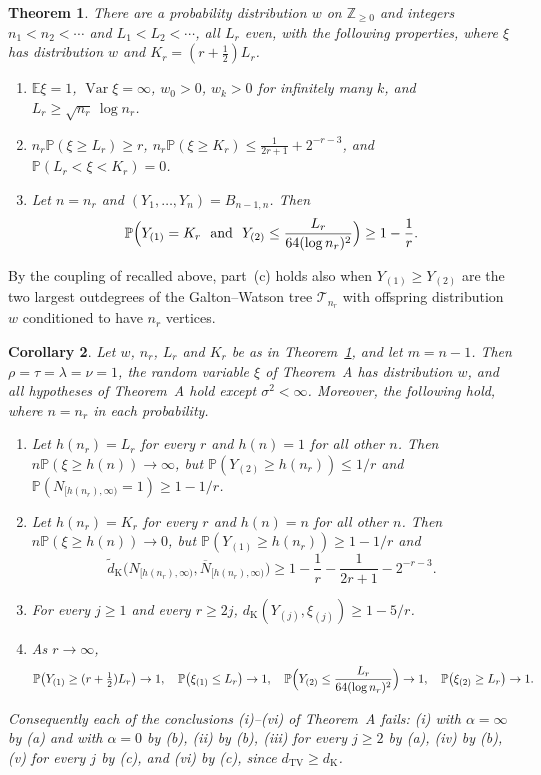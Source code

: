 \documentclass[11pt]{amsart}
\newtheorem{theorem}{Theorem}
\newtheorem{corollary}[theorem]{Corollary}
\numberwithin{equation}{section}
\newcommand{\Pp}{\mathbb P}
\newcommand{\E}{\mathbb E}
\newcommand{\Z}{\mathbb Z}
\newcommand{\cT}{\mathcal T}
\newcommand{\Nb}{\overline N}
\newcommand{\dK}{d_{\mathrm K}}
\newcommand{\tdK}{\widetilde d_{\mathrm K}}
\newcommand{\dTV}{d_{\mathrm{TV}}}
\DeclareMathOperator{\Var}{Var}
\begin{document}
\begin{theorem}\label{thm:main}
There are a probability distribution $w$ on $\Z_{\ge0}$ and integers $n_1<n_2<\cdots$ and $L_1<L_2<\cdots$, all $L_r$ even, with the following properties, where $\xi$ has distribution $w$ and $K_r=(r+\frac12)L_r$.
\begin{enumerate}[label=\textup{(\alph*)}]
\item $\E\xi=1$, $\Var\xi=\infty$, $w_0>0$, $w_k>0$ for infinitely many $k$, and $L_r\ge\sqrt{n_r}\,\log n_r$.
\item $n_r\Pp(\xi\ge L_r)\ge r$, $n_r\Pp(\xi\ge K_r)\le\frac1{2r+1}+2^{-r-3}$, and $\Pp(L_r<\xi<K_r)=0$.
\item Let $n=n_r$ and $(Y_1,\dots,Y_n)=B_{n-1,n}$. Then
\[
\Pp\Bigl(Y_{(1)}=K_r\ \text{ and }\ Y_{(2)}\le\frac{L_r}{64(\log n_r)^2}\Bigr)\ge1-\frac1r.
\]
\end{enumerate}
\end{theorem}

By the coupling of \cite[Lemma~17.1]{J12} recalled above, part~(c) holds also when $Y_{(1)}\ge Y_{(2)}$ are the two largest outdegrees of the Galton--Watson tree $\cT_{n_r}$ with offspring distribution $w$ conditioned to have $n_r$ vertices.

\begin{corollary}\label{cor:fail}
Let $w$, $n_r$, $L_r$ and $K_r$ be as in Theorem~\ref{thm:main}, and let $m=n-1$. Then $\rho=\tau=\lambda=\nu=1$, the random variable $\xi$ of Theorem~A has distribution $w$, and all hypotheses of Theorem~A hold except $\sigma^2<\infty$. Moreover, the following hold, where $n=n_r$ in each probability.
\begin{enumerate}[label=\textup{(\alph*)}]
\item Let $h(n_r)=L_r$ for every $r$ and $h(n)=1$ for all other $n$. Then $n\Pp(\xi\ge h(n))\to\infty$, but $\Pp(Y_{(2)}\ge h(n_r))\le1/r$ and $\Pp(N_{[h(n_r),\infty)}=1)\ge1-1/r$.
\item Let $h(n_r)=K_r$ for every $r$ and $h(n)=n$ for all other $n$. Then $n\Pp(\xi\ge h(n))\to0$, but $\Pp(Y_{(1)}\ge h(n_r))\ge1-1/r$ and
\[
\tdK\bigl(N_{[h(n_r),\infty)},\Nb_{[h(n_r),\infty)}\bigr)\ge1-\frac1r-\frac1{2r+1}-2^{-r-3}.
\]
\item For every $j\ge1$ and every $r\ge2j$, $\dK(Y_{(j)},\xi_{(j)})\ge1-5/r$.
\item As $r\to\infty$,
\[
\Pp\bigl(Y_{(1)}\ge(r+\tfrac12)L_r\bigr)\to1,\quad \Pp\bigl(\xi_{(1)}\le L_r\bigr)\to1,\quad \Pp\Bigl(Y_{(2)}\le\frac{L_r}{64(\log n_r)^2}\Bigr)\to1,\quad \Pp\bigl(\xi_{(2)}\ge L_r\bigr)\to1.
\]
\end{enumerate}
Consequently each of the conclusions \textup{(i)--(vi)} of Theorem~A fails: \textup{(i)} with $\alpha=\infty$ by \textup{(a)} and with $\alpha=0$ by \textup{(b)}, \textup{(ii)} by \textup{(b)}, \textup{(iii)} for every $j\ge2$ by \textup{(a)}, \textup{(iv)} by \textup{(b)}, \textup{(v)} for every $j$ by \textup{(c)}, and \textup{(vi)} by \textup{(c)}, since $\dTV\ge\dK$.
\end{corollary}
\end{document}
